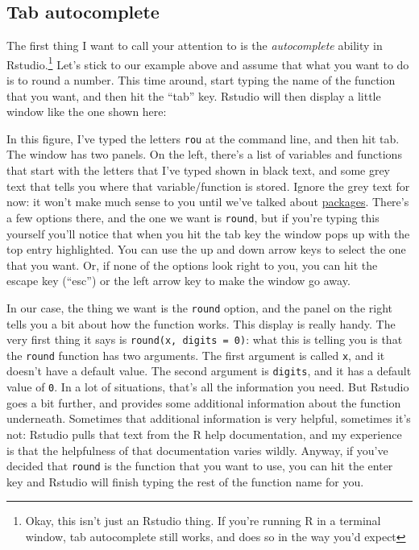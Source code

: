 \documentclass[]{book}
\let\rmarkdownfootnote\footnote%
\def\footnote{\protect\rmarkdownfootnote}
\begin{document}
\hypertarget{tab-autocomplete}{%
\subsection{Tab autocomplete}\label{tab-autocomplete}}

The first thing I want to call your attention to is the \emph{autocomplete} ability in Rstudio.\footnote{Okay, this isn't just an Rstudio thing. If you're running R in a terminal window, tab autocomplete still works, and does so in the way you'd expect}
Let's stick to our example above and assume that what you want to do is to round a number. This time around, start typing the name of the function that you want, and then hit the ``tab'' key. Rstudio will then display a little window like the one shown here:

In this figure, I've typed the letters \texttt{rou} at the command line, and then hit tab. The window has two panels. On the left, there's a list of variables and functions that start with the letters that I've typed shown in black text, and some grey text that tells you where that variable/function is stored. Ignore the grey text for now: it won't make much sense to you until we've talked about \href{./packages.html}{packages}. There's a few options there, and the one we want is \texttt{round}, but if you're typing this yourself you'll notice that when you hit the tab key the window pops up with the top entry highlighted. You can use the up and down arrow keys to select the one that you want. Or, if none of the options look right to you, you can hit the escape key (``esc'') or the left arrow key to make the window go away.

In our case, the thing we want is the \texttt{round} option, and the panel on the right tells you a bit about how the function works. This display is really handy. The very first thing it says is \texttt{round(x,\ digits\ =\ 0)}: what this is telling you is that the \texttt{round} function has two arguments. The first argument is called \texttt{x}, and it doesn't have a default value. The second argument is \texttt{digits}, and it has a default value of \texttt{0}. In a lot of situations, that's all the information you need. But Rstudio goes a bit further, and provides some additional information about the function underneath. Sometimes that additional information is very helpful, sometimes it's not: Rstudio pulls that text from the R help documentation, and my experience is that the helpfulness of that documentation varies wildly. Anyway, if you've decided that \texttt{round} is the function that you want to use, you can hit the enter key and Rstudio will finish typing the rest of the function name for you.
\end{document}
